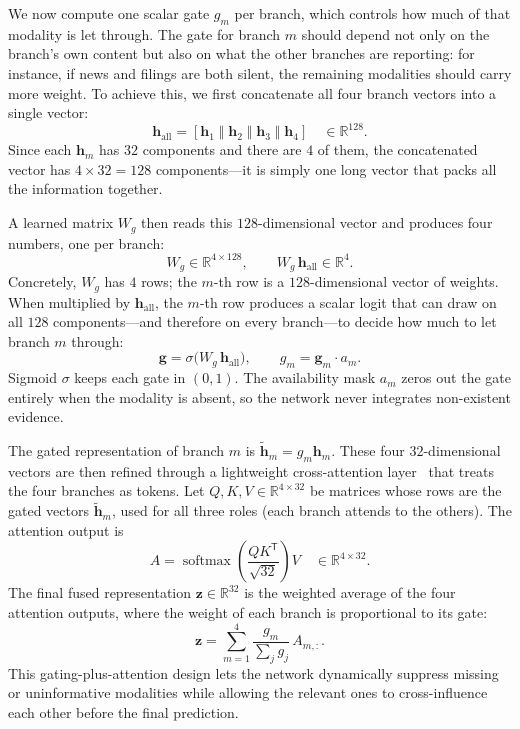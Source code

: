 \documentclass[runningheads]{llncs}
\begin{document}
We now compute one scalar gate $g_m$ per branch, which controls how much of
that modality is let through. The gate for branch $m$ should depend not only on
the branch's own content but also on what the other branches are reporting: for
instance, if news and filings are both silent, the remaining modalities should
carry more weight. To achieve this, we first concatenate all four branch
vectors into a single vector:
\[
\mathbf{h}_{\text{all}} = [\mathbf{h}_1 \;\Vert\; \mathbf{h}_2 \;\Vert\;
\mathbf{h}_3 \;\Vert\; \mathbf{h}_4]
\quad \in \mathbb{R}^{128}.
\]
Since each $\mathbf{h}_m$ has $32$ components and there are $4$ of them, the
concatenated vector has $4 \times 32 = 128$ components---it is simply one long
vector that packs all the information together.

A learned matrix $W_g$ then reads this $128$-dimensional vector and produces
four numbers, one per branch:
\[
W_g \in \mathbb{R}^{4 \times 128},
\qquad
W_g\,\mathbf{h}_{\text{all}} \in \mathbb{R}^{4}.
\]
Concretely, $W_g$ has $4$ rows; the $m$-th row is a $128$-dimensional vector
of weights. When multiplied by $\mathbf{h}_{\text{all}}$, the $m$-th row
produces a scalar logit that can draw on all $128$ components---and therefore
on every branch---to decide how much to let branch $m$ through:
\begin{equation}
\mathbf{g} = \sigma\!\big(W_g\,\mathbf{h}_{\text{all}}\big),
\qquad
g_m = \mathbf{g}_m \cdot a_m .
\end{equation}
Sigmoid $\sigma$ keeps each gate in $(0,1)$. The availability mask $a_m$
zeros out the gate entirely when the modality is absent, so the network never
integrates non-existent evidence.

The gated representation of branch $m$ is $\tilde{\mathbf{h}}_m = g_m
\mathbf{h}_m$. These four $32$-dimensional vectors are then refined through a
lightweight cross-attention layer~\cite{vaswani2017} that treats the four
branches as tokens.
Let $Q, K, V \in \mathbb{R}^{4 \times 32}$ be matrices whose rows are the
gated vectors $\tilde{\mathbf{h}}_m$, used for all three roles (each branch
attends to the others). The attention output is
\begin{equation}
A = \operatorname{softmax}\!\left(\frac{Q K^{\mathsf{T}}}{\sqrt{32}}\right) V
\quad \in \mathbb{R}^{4 \times 32}.
\end{equation}
The final fused representation $\mathbf{z} \in \mathbb{R}^{32}$ is the weighted
average of the four attention outputs, where the weight of each branch is
proportional to its gate:
\begin{equation}
\mathbf{z} = \sum_{m=1}^{4} \frac{g_m}{\sum_{j} g_j} \, A_{m,:}.
\end{equation}
This gating-plus-attention design lets the network dynamically suppress
missing or uninformative modalities while allowing the relevant ones to
cross-influence each other before the final prediction.
\end{document}
